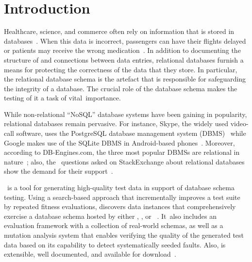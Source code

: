 \section{Introduction}\label{sec:intro}


Healthcare, science, and commerce often rely on information that is stored in
databases~\cite{kapfhammer2007comprehensive}.  When this data is incorrect, passengers can have their flights delayed or
patients may receive the wrong medication~\cite{databasebook}.  In addition to documenting the structure of and
connections between data entries, relational databases furnish a means for protecting the correctness of the data that
they store.  In particular, the relational database schema is the artefact that is responsible for safeguarding the
integrity of a database. The crucial role of the database schema makes the testing of it a task of \mbox{vital
importance}.


While non-relational ``NoSQL'' database systems have been gaining in popularity, relational databases remain pervasive.
For instance, Skype, the widely used video-call software, uses the PostgreSQL database management system
(DBMS)~\cite{postgres} while Google makes use of the SQLite DBMS in Android-based phones~\cite{sqlite}. Moreover,
according to DB-Engines.com, the three most popular DBMSs are relational in nature~\cite{dbrank}; also, the
\numquestions~questions asked on StackExchange about relational databases show the demand for their
support~\cite{stackexchange}.



\sa~is a tool for generating high-quality test data in support of database schema testing. Using a search-based approach
that incrementally improves a test suite by repeated fitness evaluations, {\sa} discovers data instances that
comprehensively exercise a database schema hosted by either \hypersql, \postgresql, or
\sqlite~\cite{kapfhammer2013search}. \mbox{It also} includes an evaluation framework with a collection of real-world
schemas, as well as a mutation analysis system that enables verifying the quality of the generated test data based on
its capability to detect systematically seeded faults. Also, {\sa} is extensible, well documented, and available for
download~\cite{tool}.

